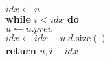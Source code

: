 \documentclass{beamer}
\begin{document}
\begin{frame}[shrink]
\begin{oframed}
\begin{flushleft}
\hspace*{1em} \hspace*{1em} \hspace*{1em} \ensuremath{\ensuremath{\mathit{idx}} \gets  \ensuremath{n}}\\
\hspace*{1em} \hspace*{1em} \hspace*{1em} {\color{black} \textbf{while}} \ensuremath{\ensuremath{\mathit{i}} < idx} {\color{black} \textbf{do}} \\
\hspace*{1em} \hspace*{1em} \hspace*{1em} \hspace*{1em} \ensuremath{\ensuremath{\mathit{u}} \gets  \ensuremath{\ensuremath{\mathit{u}}.prev}}\\
\hspace*{1em} \hspace*{1em} \hspace*{1em} \hspace*{1em} \ensuremath{\ensuremath{\mathit{idx}} \gets  \ensuremath{\ensuremath{\mathit{idx}} - \ensuremath{\mathit{u}}.\ensuremath{\mathit{d}}.\mathrm{size}()}}\\
\hspace*{1em} \hspace*{1em} {\color{black} \textbf{return}} \ensuremath{\ensuremath{\mathit{u}}, \ensuremath{\mathit{i}}-\ensuremath{\mathit{idx}}}\\
\end{flushleft}
\end{oframed}

\end{frame}
\end{document}
